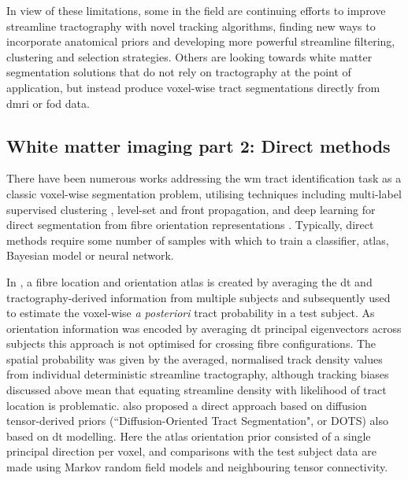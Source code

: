 In view of these limitations, some in the field are continuing efforts to improve streamline tractography with novel tracking algorithms, finding new ways to incorporate anatomical priors and developing more powerful streamline filtering, clustering and selection strategies.
Others are looking towards white matter segmentation solutions that do not rely on tractography at the point of application, but instead produce voxel-wise tract segmentations directly from \gls{dmri} or \gls{fod} data.

\subsection{White matter imaging part 2: Direct methods}

There have been numerous works addressing the \gls{wm} tract identification task as a classic voxel-wise segmentation problem, utilising techniques including multi-label supervised clustering \autocite{Ratnarajah2014}, level-set and front propagation\textcite{Nazem-Zadeh2011, Hao2014}, and deep learning for direct segmentation from fibre orientation representations \autocite{Wasserthal2018,Li2020}.
Typically, direct methods require some number of samples with which to train a classifier, atlas, Bayesian model or neural network.

In \textcite{Hagler2009}, a fibre location and orientation atlas is created by averaging the \gls{dt} and tractography-derived information from multiple subjects and subsequently used to estimate the voxel-wise \textit{a posteriori} tract probability in a test subject.
As orientation information was encoded by averaging \gls{dt} principal eigenvectors across subjects this approach is not optimised for crossing fibre configurations.
The spatial probability was given by the averaged, normalised track density values from individual deterministic streamline tractography, although tracking biases discussed above mean that equating streamline density with likelihood of tract location is problematic\autocite{Rheault2019,Smith2013}.
\textcite{Bazin2011} also proposed a direct approach based on diffusion tensor-derived priors (``Diffusion-Oriented Tract Segmentation", or DOTS) also based on \gls{dt} modelling.
Here the atlas orientation prior consisted of a single principal direction per voxel, and comparisons with the test subject data are made using Markov random field models and neighbouring tensor connectivity.

